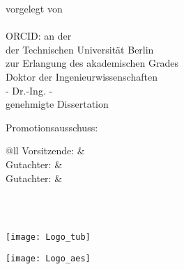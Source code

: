 {{\begin{titlepage}
\begin{center}
				\huge\textbf{\mytitle}
				\vfill
				\Large vorgelegt von\\
				\autor\\
				ORCID: \orcid
				\vfill
				an der \myfaculty \\
				der Technischen Universität Berlin\\
				zur Erlangung des akademischen Grades\\
				\vspace{0.5cm}
				Doktor der Ingenieurwissenschaften\\
				- Dr.-Ing. -\\
				\vspace{0.5cm}
				genehmigte Dissertation
			\end{center}
			\vfill
			\normalsize
			Promotionsausschuss:\\[2ex]
			\begin{tabular}{@{}ll}
			Vorsitzende: & \chairman \\
			Gutachter: & \firstreviewer \\
			Gutachter: & \secondreviewer \\
			\\[3ex]
			\end{tabular}
			\vfill
			\centering
			\myplace\ \the\year		
		\end{titlepage}
		}{
		\begin{titlepage}
			\begin{center}
				\begin{minipage}{0.2\textwidth}
					\centering
					\vfill	
					\texttt{[image: Logo\_tub]}
					\vfill
				\end{minipage}
				\hfill
				\begin{minipage}{0.7\textwidth}
					\centering
					\vfill
					\texttt{[image: Logo\_aes]}
					\vfill
				\end{minipage}

\end{center}
\end{titlepage}}}
